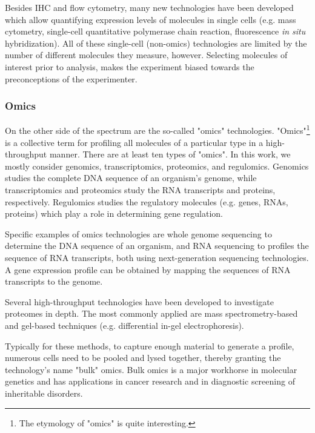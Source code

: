 Besides IHC and flow cytometry, many new technologies have been developed which allow quantifying expression levels of molecules in single cells (e.g. mass cytometry, single-cell quantitative polymerase chain reaction, fluorescence \emph{in situ} hybridization). All of these single-cell (non-omics) technologies are limited by the number of different molecules they measure, however. Selecting molecules of interest prior to analysis, makes the experiment biased towards the preconceptions of the experimenter.

\subsubsection{Omics}
On the other side of the spectrum are the so-called "omics" technologies. "Omics"\footnote{The etymology of "omics" is quite interesting\cite{yadav_wholenesssuffixomics_2007}.} is a collective term for profiling all molecules of a particular type in a high-throughput manner.
There are at least ten types of "omics". In this work, we mostly consider genomics, transcriptomics, proteomics, and regulomics. Genomics studies the complete DNA sequence of an organism's genome, while transcriptomics and proteomics study the RNA transcripts and proteins, respectively. Regulomics studies the regulatory molecules (e.g. genes, RNAs, proteins) which play a role in determining gene regulation.

Specific examples of omics technologies are whole genome sequencing to determine the DNA sequence of an organism, and RNA sequencing to profiles the sequence of RNA transcripts, both using next-generation sequencing technologies. A gene expression profile can be obtained by mapping the sequences of RNA transcripts to the genome.

Several high-throughput technologies have been developed to investigate proteomes in depth. The most commonly applied are mass spectrometry-based and gel-based techniques (e.g. differential in-gel electrophoresis).


Typically for these methods, to capture enough material to generate a profile, numerous cells need to be pooled and lysed together, thereby granting the technology's name "bulk" omics.
Bulk omics is a major workhorse in molecular genetics and has applications in cancer research and in diagnostic screening of inheritable disorders.


